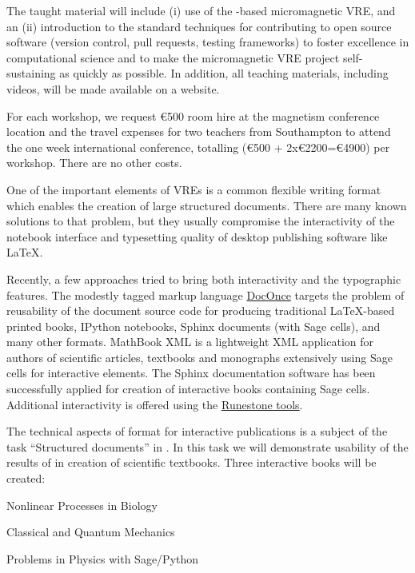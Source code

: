 \begin{workpackage}
\begin{tasklist}
\begin{task}[title=Micromagnetic VRE dissemination workshops,
id=dissemination-of-oommf-nb-workshops,lead=USO,PM=6]
The taught material will include (i) use of the \Jupyter-based
micromagnetic VRE, and an (ii) introduction to the standard techniques
for contributing to open source software (version control, pull
requests, testing frameworks) to foster excellence in computational
science and to make the micromagnetic VRE project self-sustaining as quickly
as possible. In addition, all teaching materials, including videos,
will be made available on a website.

For each workshop, we request \euro{500} room hire at the magnetism conference
location and the travel expenses for two teachers from Southampton to
attend the one week international conference, totalling (\euro{500} +
2x\euro{2200}=\euro{4900}) per workshop. There are no other costs.
\end{task}

\begin{task}[title=Demonstrator: Interactive books,
id=ibook,lead=US,PM=30]

One of the important elements of VREs is a common flexible writing format which
enables the creation of large structured documents. There are many
known solutions to that problem, but they usually compromise the
interactivity of the notebook interface and typesetting quality of desktop
publishing software like LaTeX.

Recently, a few approaches tried to bring both interactivity and the
typographic features. The modestly tagged markup language
\href{http://hplgit.github.io/doconce/doc/web/}{DocOnce}
targets the problem of reusability of the document source code for
producing traditional LaTeX-based printed books, IPython notebooks, Sphinx
documents (with Sage cells), and many other formats. MathBook XML
is a lightweight XML application for authors of scientific articles,
textbooks and monographs extensively using Sage cells for
interactive elements. The Sphinx documentation software has been
successfully applied for creation of interactive books containing Sage
cells. Additional interactivity is offered using the \href{http://runestoneinteractive.org}{Runestone tools}.

The technical aspects of format for interactive publications is a
subject of the task ``Structured documents'' in
. In this task we will demonstrate usability
of the results of  in creation of scientific
textbooks. Three interactive books will be created:

\begin{compactitem}
\item Nonlinear Processes in Biology
\item Classical and Quantum Mechanics
\item Problems in Physics with Sage/Python
\end{compactitem}


\end{task}
\end{tasklist}
\end{workpackage}
